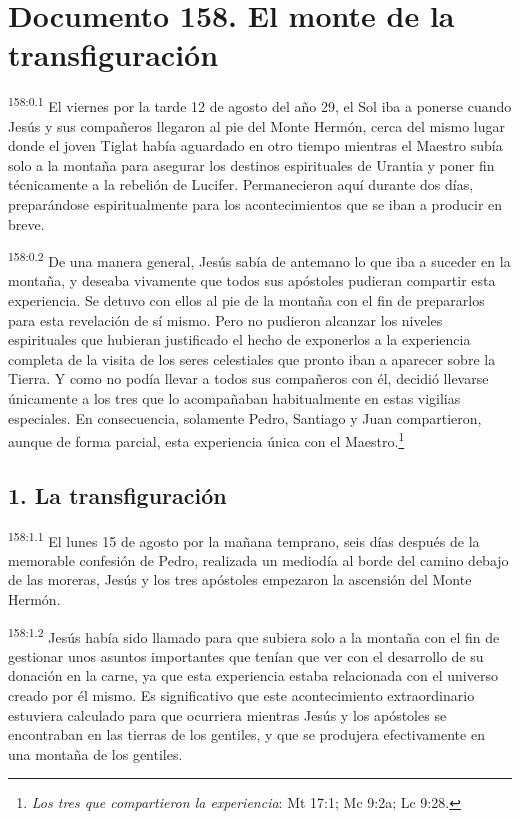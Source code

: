 \chapter{Documento 158. El monte de la transfiguración}
\par
\textsuperscript{158:0.1} El viernes por la tarde 12 de agosto del año 29, el Sol iba a ponerse cuando Jesús y sus compañeros llegaron al pie del Monte Hermón, cerca del mismo lugar donde el joven Tiglat había aguardado en otro tiempo mientras el Maestro subía solo a la montaña para asegurar los destinos espirituales de Urantia y poner fin técnicamente a la rebelión de Lucifer. Permanecieron aquí durante dos días, preparándose espiritualmente para los acontecimientos que se iban a producir en breve.

\par
\textsuperscript{158:0.2} De una manera general, Jesús sabía de antemano lo que iba a suceder en la montaña, y deseaba vivamente que todos sus apóstoles pudieran compartir esta experiencia. Se detuvo con ellos al pie de la montaña con el fin de prepararlos para esta revelación de sí mismo. Pero no pudieron alcanzar los niveles espirituales que hubieran justificado el hecho de exponerlos a la experiencia completa de la visita de los seres celestiales que pronto iban a aparecer sobre la Tierra. Y como no podía llevar a todos sus compañeros con él, decidió llevarse únicamente a los tres que lo acompañaban habitualmente en estas vigilias especiales. En consecuencia, solamente Pedro, Santiago y Juan compartieron, aunque de forma parcial, esta experiencia única con el Maestro.\footnote{\textit{Los tres que compartieron la experiencia}: Mt 17:1; Mc 9:2a; Lc 9:28.}

\section*{1. La transfiguración}
\par
\textsuperscript{158:1.1} El lunes 15 de agosto por la mañana temprano, seis días después de la memorable confesión de Pedro, realizada un mediodía al borde del camino debajo de las moreras, Jesús y los tres apóstoles empezaron la ascensión del Monte Hermón.

\par
\textsuperscript{158:1.2} Jesús había sido llamado para que subiera solo a la montaña con el fin de gestionar unos asuntos importantes que tenían que ver con el desarrollo de su donación en la carne, ya que esta experiencia estaba relacionada con el universo creado por él mismo. Es significativo que este acontecimiento extraordinario estuviera calculado para que ocurriera mientras Jesús y los apóstoles se encontraban en las tierras de los gentiles, y que se produjera efectivamente en una montaña de los gentiles.

